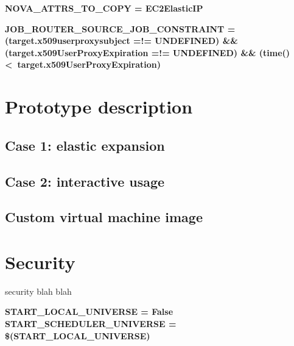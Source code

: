 \documentclass[a4paper]{jpconf}
\begin{document}
\begin{center}
    \colorbox{htcondorbox}{
        \begin{minipage}{\textwidth}
        \small
            \bf{NOVA\_ATTRS\_TO\_COPY = EC2ElasticIP
            }
        \end{minipage}
    }
\end{center}


\begin{center}
    \colorbox{htcondorbox}{
        \begin{minipage}{\textwidth}
        \small
            \bf{JOB\_ROUTER\_SOURCE\_JOB\_CONSTRAINT = \newline
               (target.x509userproxysubject =!= UNDEFINED) \&\& \newline
               (target.x509UserProxyExpiration =!= UNDEFINED) \&\& \newline
               (time() \textless \  target.x509UserProxyExpiration)
            }
        \end{minipage}
    }
\end{center}





\section{Prototype description}

\subsection{Case 1: elastic expansion}

\subsection{Case 2: interactive usage}

\subsection{Custom virtual machine image}

\section{Security}

security blah blah

\begin{center}
    \colorbox{htcondorbox}{
        \begin{minipage}{\textwidth}
        \small
            \bf{START\_LOCAL\_UNIVERSE = False \newline
                START\_SCHEDULER\_UNIVERSE = \$(START\_LOCAL\_UNIVERSE)
            }
        \end{minipage}
    }
\end{center}
\end{document}
